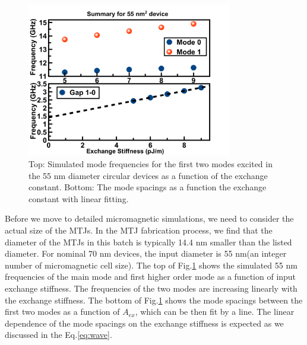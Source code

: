 \begin{figure}[!ht]
  \centering
  \includegraphics[width=0.8\textwidth]{fig/2018/sim/55sim}
   \caption{Top: Simulated mode frequencies for the first two modes excited in the 55 nm diameter circular devices as a function of the exchange constant. Bottom: The mode spacings as a function the exchange constant with linear fitting.}
  \label{fig:55sim}
\end{figure}

Before we move to detailed micromagnetic simulations, we need to consider the actual size of the MTJs. In the MTJ fabrication process, we find that the diameter of the MTJs in this batch is typically 14.4 nm smaller than the listed diameter. For nominal 70 nm devices, the input diameter is 55 nm(an integer number of micromagnetic cell size). The top of Fig.\ref{fig:55sim} shows the simulated 55 nm frequencies of the main mode and first higher order mode as a function of input exchange stiffness. The frequencies of the two modes are increasing linearly with the exchange stiffness. The bottom of Fig.\ref{fig:55sim} shows the mode spacings between the first two modes as a function of $A_{ex}$, which can be then fit by a line. The linear dependence of the mode spacings on the exchange stiffness is expected as we discussed in the Eq.\ref{eq:wave}. 

